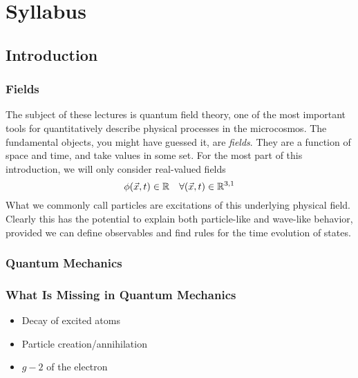 \documentclass[12pt]{article}
\begin{document}




\section{Syllabus}

\subsection{Introduction}

\subsubsection{Fields}

The subject of these lectures is quantum field theory, one of the most
important tools for quantitatively describe physical processes in the
microcosmos. The fundamental objects, you might have guessed it, are
\emph{fields}. They are a function of space and time, and take values
in some set. For the most part of this introduction, we will only
consider real-valued fields
\begin{equation}
  \phi(\vec x, t) \in {\mathbb{R}}
  \quad \forall (\vec x, t) \in {\mathbb{R}}^{3,1}  
\end{equation}
What we commonly call particles are excitations of this underlying
physical field. Clearly this has the potential to explain both
particle-like and wave-like behavior, provided we can define
observables and find rules for the time evolution of states.



\subsubsection{Quantum Mechanics}





\subsubsection{What Is Missing in Quantum Mechanics}

\begin{itemize}
\item Decay of excited atoms
\item Particle creation/annihilation
\item $g-2$ of the electron
\end{itemize}
\end{document}
